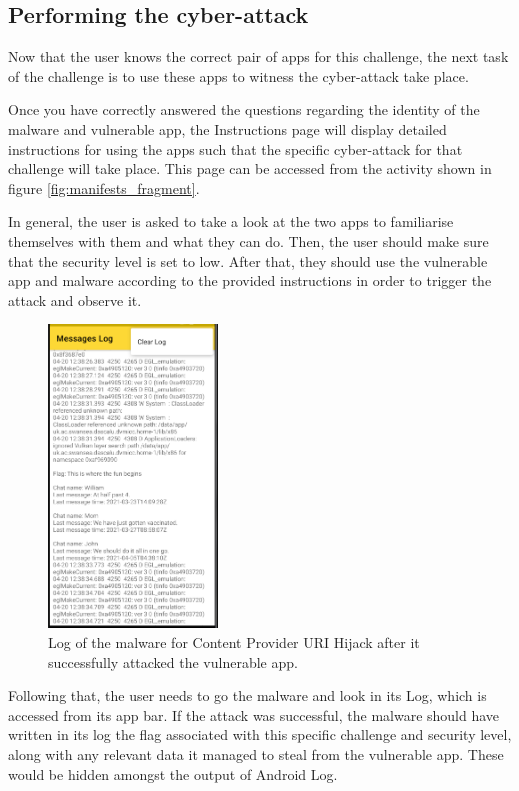     \subsection{Performing the cyber-attack}
        \label{subsec:perform_attack}
        
    Now that the user knows the correct pair of apps for this challenge, the next task of the challenge is to use these apps to witness the cyber-attack take place.
    
    Once you have correctly answered the questions regarding the identity of the malware and vulnerable app, the Instructions page will display detailed instructions for using the apps such that the specific cyber-attack for that challenge will take place. This page can be accessed from the activity shown in figure \ref{fig:manifests_fragment}.
    
    In general, the user is asked to take a look at the two apps to familiarise themselves with them and what they can do. Then, the user should make sure that the security level is set to low. After that, they should use the vulnerable app and malware according to the provided instructions in order to trigger the attack and observe it. 
    
    \begin{figure}
        \centering
        \includegraphics[width=0.4\textwidth]{graphics/log.PNG}
        \caption{Log of the malware for Content Provider URI Hijack after it successfully attacked the vulnerable app.}
        \label{fig:malware_log}
    \end{figure}
    
    Following that, the user needs to go the malware and look in its Log, which is accessed from its app bar. If the attack was successful, the malware should have written in its log the flag associated with this specific challenge and security level, along with any relevant data it managed to steal from the vulnerable app. These would be hidden amongst the output of Android Log. 
    
